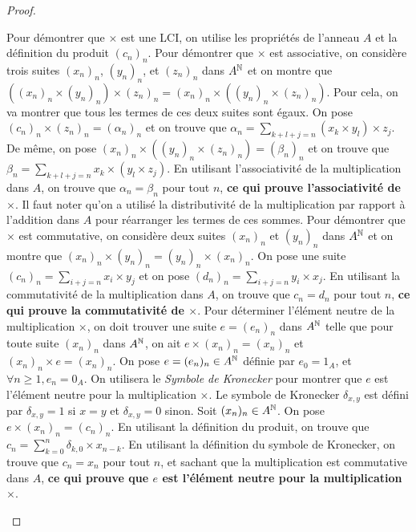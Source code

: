 \documentclass[12pt,a4paper]{report}
\begin{document}
\begin{proof}
    \begin{outline}
        \1 Pour démontrer que $\times$ est une LCI, on utilise les propriétés de l'anneau $A$ et la définition du produit $(c_n)_n$.
        \1 Pour démontrer que $\times$ est associative, on considère trois suites $(x_n)_n$, $(y_n)_n$, et $(z_n)_n$ dans $A^{\mathbb{N}}$ et on montre que $((x_n)_n \times (y_n)_n) \times (z_n)_n = (x_n)_n \times ((y_n)_n \times (z_n)_n)$.
            \2 Pour cela, on va montrer que tous les termes de ces deux suites sont égaux.
            \2 On pose $(c_n)_n\times (z_n)_n = (\alpha_n)_n$ et on trouve que $\alpha_n = \sum_{k+l+j=n}(x_k \times y_l)\times z_j$.
            \2 De même, on pose $(x_n)_n\times ((y_n)_n\times(z_n)_n) = (\beta_n)_n$ et on trouve que $\beta_n = \sum_{k+l+j=n}x_k\times (y_l \times z_j)$.
            \2 En utilisant l'associativité de la multiplication dans $A$, on trouve que $\alpha_n = \beta_n$ pour tout $n$, \textbf{ce qui prouve l'associativité de $\times$}.
            \2 Il faut noter qu'on a utilisé la distributivité de la multiplication par rapport à l'addition dans $A$ pour réarranger les termes de ces sommes.
        \1 Pour démontrer que $\times$ est commutative, on considère deux suites $(x_n)_n$ et $(y_n)_n$ dans $A^{\mathbb{N}}$ et on montre que $(x_n)_n \times (y_n)_n = (y_n)_n \times (x_n)_n$.
            \2 On pose une suite $(c_n)_n = \sum_{i+j=n} x_i \times y_j$ et on pose $(d_n)_n = \sum_{i+j=n} y_i \times x_j$.
            \2 En utilisant la commutativité de la multiplication dans $A$, on trouve que $c_n = d_n$ pour tout $n$, \textbf{ce qui prouve la commutativité de $\times$}.
        \1 Pour déterminer l'élément neutre de la multiplication $\times$, on doit trouver une suite $e = (e_n)_n$ dans $A^{\mathbb{N}}$ telle que pour toute suite $(x_n)_n$ dans $A^{\mathbb{N}}$, on ait $e \times (x_n)_n = (x_n)_n$ et $(x_n)_n \times e = (x_n)_n$.
            \2 On pose $e = (e_n)_n \in A^{\mathbb{N}}$ définie par $e_0 = 1_A$, et $\forall n \ge 1, e_n = 0_A$.
            \2 On utilisera le \textit{Symbole de Kronecker} pour montrer que $e$ est l'élément neutre pour la multiplication $\times$.
            \3 Le symbole de Kronecker $\delta_{x,y}$ est défini par $\delta_{x,y} = 1$ si $x=y$ et $\delta_{x,y} = 0$ sinon.
            \2 Soit $(x_n)_n \in A^{\mathbb{N}}$. On pose $e\times (x_n)_n = (c_n)_n$.
            \2 En utilisant la définition du produit, on trouve que $c_n = \sum_{k=0}^n \delta_{k,0} \times x_{n-k}$.
            \2 En utilisant la définition du symbole de Kronecker, on trouve que $c_n = x_n$ pour tout $n$, et sachant que la multiplication est commutative dans $A$, \textbf{ce qui prouve que $e$ est l'élément neutre pour la multiplication $\times$}.

\end{outline}
\end{proof}
\end{document}
